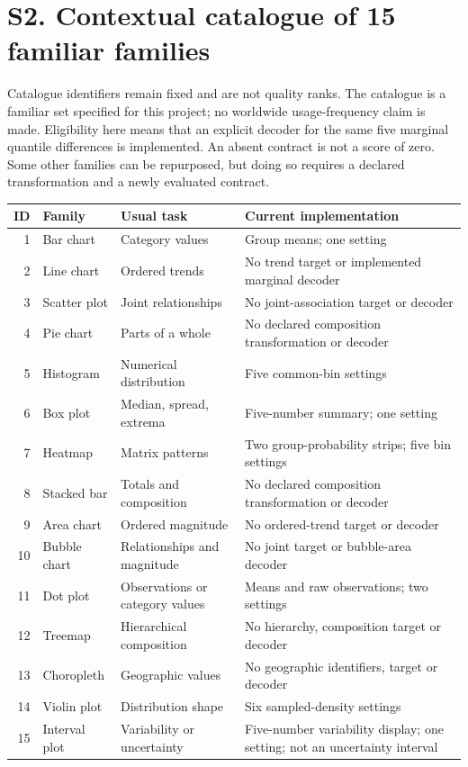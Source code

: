 \documentclass[10pt]{article}
\begin{document}
\section*{S2. Contextual catalogue of 15 familiar families}
Catalogue identifiers remain fixed and are not quality ranks. The catalogue is a familiar set specified for this project; no worldwide usage-frequency claim is made. Eligibility here means that an explicit decoder for the same five marginal quantile differences is implemented. An absent contract is not a score of zero. Some other families can be repurposed, but doing so requires a declared transformation and a newly evaluated contract.
\begin{longtable}{rp{2.7cm}p{4.3cm}p{6.7cm}}\toprule
ID & Family & Usual task & Current implementation\\\midrule\endhead
1 & Bar chart & Category values & Group means; one setting\\
2 & Line chart & Ordered trends & No trend target or implemented marginal decoder\\
3 & Scatter plot & Joint relationships & No joint-association target or decoder\\
4 & Pie chart & Parts of a whole & No declared composition transformation or decoder\\
5 & Histogram & Numerical distribution & Five common-bin settings\\
6 & Box plot & Median, spread, extrema & Five-number summary; one setting\\
7 & Heatmap & Matrix patterns & Two group-probability strips; five bin settings\\
8 & Stacked bar & Totals and composition & No declared composition transformation or decoder\\
9 & Area chart & Ordered magnitude & No ordered-trend target or decoder\\
10 & Bubble chart & Relationships and magnitude & No joint target or bubble-area decoder\\
11 & Dot plot & Observations or category values & Means and raw observations; two settings\\
12 & Treemap & Hierarchical composition & No hierarchy, composition target or decoder\\
13 & Choropleth & Geographic values & No geographic identifiers, target or decoder\\
14 & Violin plot & Distribution shape & Six sampled-density settings\\
15 & Interval plot & Variability or uncertainty & Five-number variability display; one setting; not an uncertainty interval\\\bottomrule
\end{longtable}
\end{document}
